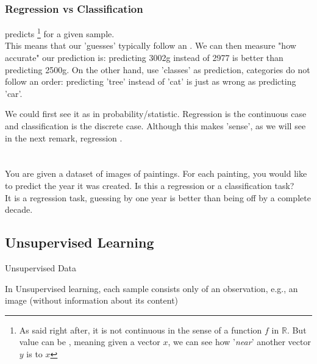 \subsubsection{Regression vs Classification}%

	 predicts \footnote{As said right after, it is not continuous in the sense of a function $f$ in $ \mathbb{R}$. But value can be , meaning given a vector $x$, we can see how '\textit{near}' another vector $y$ is to $x$} for a given sample.\\
	This means that our 'guesses' typically follow an . We can then measure "how accurate" our prediction is: predicting 3002g instead of 2977 is better than predicting 2500g.
	On the other hand,  use 'classes' as prediction, categories do not follow an order: predicting 'tree' instead of 'cat' is just as wrong as predicting 'car'.

	\begin{framedremark}
	
		We could first see it as in probability/statistic. Regression is the continuous case and classification is the discrete case. Although this makes 'sense', as we will see in the next remark, regression .\\
		$ $\\
		$ $\\
	You are given a dataset of images of paintings. For each painting, you would like to predict the year it was created. Is this a regression or a classification task?\\
	It is a regression task, guessing by one year is better than being off by a complete decade.
	\end{framedremark}


\subsection{Unsupervised Learning}
\begin{parag}{Unsupervised Data}
	\begin{definition}
		In Unsupervised learning, each sample consists only of an observation, e.g., an image (without information about its content)
	\end{definition}
\end{parag}

